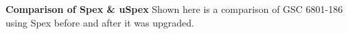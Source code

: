 {\bf Comparison of Spex \& uSpex} Shown here is a comparison of GSC 6801-186 using Spex before and after it was upgraded.~\label{fig:uSpex-Spex}
